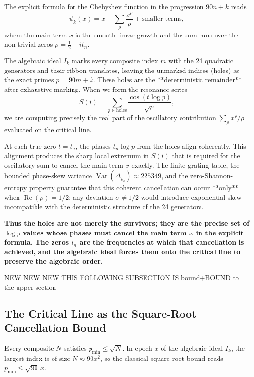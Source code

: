 \documentclass[11pt,a4paper]{article}
\begin{document}
The explicit formula for the Chebyshev function in the progression \(90n+k\) reads
\[
\psi_k(x) = x - \sum_{\rho} \frac{x^{\rho}}{\rho} + \text{smaller terms},
\]
where the main term \(x\) is the smooth linear growth and the sum runs over the non-trivial zeros \(\rho = \frac12 + i t_n\).

The algebraic ideal \(I_k\) marks every composite index \(m\) with the 24 quadratic generators and their ribbon translates, leaving the unmarked indices (holes) as the exact primes \(p=90m+k\). These holes are the **deterministic remainder** after exhaustive marking. When we form the resonance series
\[
S(t) = \sum_{p \in \text{holes}} \frac{\cos(t \log p)}{\sqrt{p}},
\]
we are computing precisely the real part of the oscillatory contribution \(\sum_{\rho} x^{\rho}/\rho\) evaluated on the critical line.

At each true zero \(t=t_n\), the phases \(t_n \log p\) from the holes align coherently. This alignment produces the sharp local extremum in \(S(t)\) that is required for the oscillatory sum to cancel the main term \(x\) exactly. The finite grating table, the bounded phase-skew variance \(\operatorname{Var}(\Delta_{y_x})\approx225349\), and the zero-Shannon-entropy property guarantee that this coherent cancellation can occur **only** when \(\operatorname{Re}(\rho)=1/2\): any deviation \(\sigma\neq1/2\) would introduce exponential skew incompatible with the deterministic structure of the 24 generators.

\textbf{Thus the holes are not merely the survivors; they are the precise set of \(\log p\) values whose phases must cancel the main term \(x\) in the explicit formula. The zeros \(t_n\) are the frequencies at which that cancellation is achieved, and the algebraic ideal forces them onto the critical line to preserve the algebraic order.
}

NEW NEW NEW THIS FOLLOWING SUBSECTION IS bound+BOUND to the upper section


\subsection{The Critical Line as the Square-Root Cancellation Bound}

Every composite \(N\) satisfies \(p_{\min} \leq \sqrt{N}\). In epoch \(x\) of the algebraic ideal \(I_k\), the largest index is of size \(N \approx 90x^2\), so the classical square-root bound reads \(p_{\min} \leq \sqrt{90}\,x\).
\end{document}
